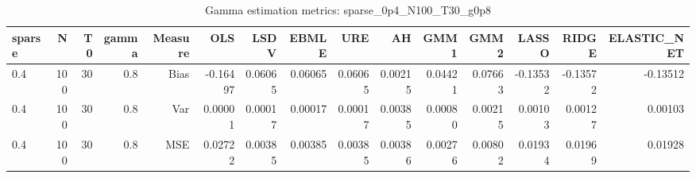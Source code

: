 \begin{table}[!htbp]\centering
\caption{Gamma estimation metrics: sparse_0p4_N100_T30_g0p8}
\label{tab:table1_sparse_0p4_N100_T30_g0p8}
\begin{tabular}{lrrrrrrrrrrrrrr}
\hline
sparse & N & T0 & gamma & Measure & OLS & LSDV & EBMLE & URE & AH & GMM1 & GMM2 & LASSO & RIDGE & ELASTIC_NET \\
\hline
0.4 & 100 & 30 & 0.8 & Bias & -0.16497 & 0.06065 & 0.06065 & 0.06065 & 0.00215 & 0.04421 & 0.07663 & -0.13532 & -0.13572 & -0.13512 \\
0.4 & 100 & 30 & 0.8 & Var & 0.00001 & 0.00017 & 0.00017 & 0.00017 & 0.00385 & 0.00080 & 0.00215 & 0.00103 & 0.00127 & 0.00103 \\
0.4 & 100 & 30 & 0.8 & MSE & 0.02722 & 0.00385 & 0.00385 & 0.00385 & 0.00386 & 0.00276 & 0.00802 & 0.01934 & 0.01969 & 0.01928 \\
\hline
\end{tabular}
\end{table}

